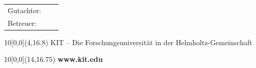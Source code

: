 \begin{titlepage}
{\begin{center}
			\begin{tabular}[ht]{l c l}
				Gutachter: & \hfill & \reviewerone \\
				Betreuer:  & \hfill & \advisor     \\
			\end{tabular}
		\end{center}
	}

	\vspace{1cm}
	\begin{center}
		\large{\submissiontime} %
	\end{center}
	\vspace{1cm}

	\begin{textblock}{10}[0,0](4,16.8)
		\tiny{
			KIT -- Die Forschungsuniversität in der Helmholtz-Gemeinschaft
		}
	\end{textblock}

	\begin{textblock}{10}[0,0](14,16.75)
		\large{
			\textbf{www.kit.edu}
		}
	\end{textblock}

\end{titlepage}
